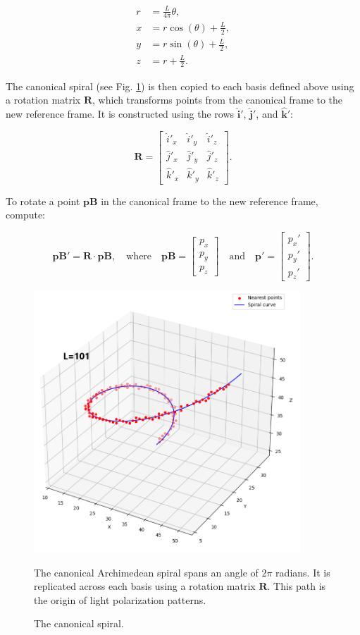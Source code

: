 \documentclass[12pt,english]{article}
\begin{document}
\begin{align}
r &= \frac{L}{4\pi} \theta, \\
x &= r \cos(\theta) + \frac{L}{2}, \\
y &= r \sin(\theta) + \frac{L}{2}, \\
z &= r + \frac{L}{2}.
\end{align}

The canonical spiral (see Fig. \ref{fig3}) is then copied to each basis defined above using a rotation matrix $\mathbf{R}$, which transforms points from the canonical frame to the new reference frame. It is constructed using the rows $\hat{\mathbf{i}}'$, $\hat{\mathbf{j}}'$, and $\hat{\mathbf{k}}'$:

\[
\mathbf{R} = 
\begin{bmatrix}
    \hat{i}'_x & \hat{i}'_y & \hat{i}'_z \\
    \hat{j}'_x & \hat{j}'_y & \hat{j}'_z \\
    \hat{k}'_x & \hat{k}'_y & \hat{k}'_z
\end{bmatrix}.
\]

To rotate a point $\mathbf{pB}$ in the canonical frame to the new reference frame, compute:

\[
\mathbf{pB}' = \mathbf{R} \cdot \mathbf{pB}, \quad
\text{where} \quad
\mathbf{pB} =
\begin{bmatrix} p_x \\ p_y \\ p_z \end{bmatrix}
\quad \text{and} \quad
\mathbf{p}' =
\begin{bmatrix} p_x' \\ p_y' \\ p_z' \end{bmatrix}.
\]

\begin{figure}
\centering
\includegraphics[width=10cm]{fig3}
\caption{The canonical spiral.}
\footnotesize{The canonical Archimedean spiral spans an angle of \(2\pi\) radians. It is replicated across each basis using a rotation matrix \( \mathbf{R} \). This path is the origin of light polarization patterns.}
\label{fig3}
\end{figure}
\end{document}
